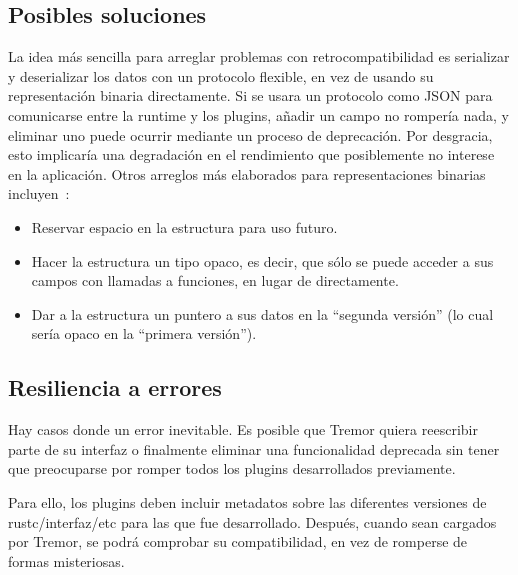 \subsection{Posibles soluciones}

La idea más sencilla para arreglar problemas con retrocompatibilidad es
serializar y deserializar los datos con un protocolo flexible, en vez de usando
su representación binaria directamente. Si se usara un protocolo como JSON para
comunicarse entre la runtime y los plugins, añadir un campo no rompería nada, y
eliminar uno puede ocurrir mediante un proceso de deprecación. Por desgracia,
esto implicaría una degradación en el rendimiento que posiblemente no interese
en la aplicación. Otros arreglos más elaborados para representaciones binarias
incluyen~\cite{swiftabi}:

\begin{itemize}
    \item Reservar espacio en la estructura para uso futuro.

    \item Hacer la estructura un tipo opaco, es decir, que sólo se puede acceder
        a sus campos con llamadas a funciones, en lugar de directamente.

    \item Dar a la estructura un puntero a sus datos en la ``segunda versión''
        (lo cual sería opaco en la ``primera versión'').

\end{itemize}

\subsection{Resiliencia a errores}

Hay casos donde un error inevitable. Es posible que Tremor quiera reescribir
parte de su interfaz o finalmente eliminar una funcionalidad deprecada sin tener
que preocuparse por romper todos los plugins desarrollados previamente.

Para ello, los plugins deben incluir metadatos sobre las diferentes versiones
de rustc/interfaz/etc para las que fue desarrollado. Después, cuando sean
cargados por Tremor, se podrá comprobar su compatibilidad, en vez de romperse de
formas misteriosas.
